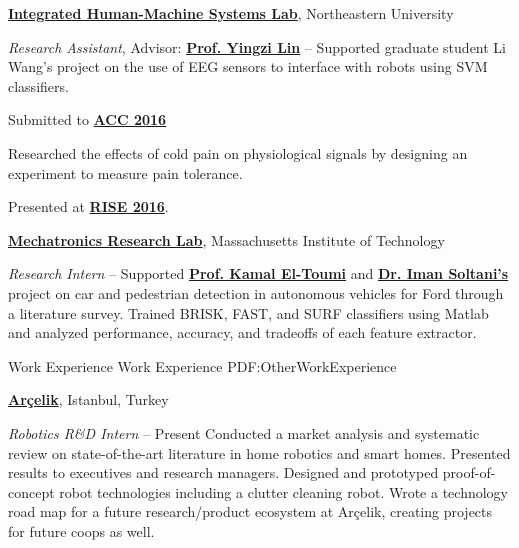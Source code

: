 \documentclass[letterpaper,MMMyyyy,nonstopmode]{simpleresumecv}
\begin{document}
\begin{Body}

\Entry
\href{http://www1.coe.neu.edu/~yilin/ihmslab.html}
{\textbf{Integrated Human-Machine Systems Lab}},
Northeastern University

\Gap
\textit{Research Assistant}, Advisor:
\href{http://www1.coe.neu.edu/~yilin/director.html}{\textbf{Prof. Yingzi Lin}}
\hfill
{} --
\BulletItem
Supported graduate student Li Wang's project on the use of EEG sensors to interface with robots using SVM classifiers. 
\begin{Detail}
	\Item
	Submitted to \href{http://acc2016.a2c2.org/}{\textbf{ACC 2016}}
\end{Detail}
\BulletItem
Researched the effects of cold pain on physiological signals by designing an experiment to measure pain tolerance.
\begin{Detail}
	\Item
	Presented at \href{https://www.northeastern.edu/rise/}{\textbf{RISE 2016}}. 
\end{Detail}


\Entry
\href{http://mechatronics.mit.edu/}
{\textbf{Mechatronics Research Lab}},
Massachusetts Institute of Technology

\Gap
\textit{Research Intern}
\hfill
{} --
\BulletItem
Supported \href{http://meche.mit.edu/people/faculty/youcef@mit.edu}{\textbf{Prof. Kamal El-Toumi}} and \href{https://www.linkedin.com/in/iman-soltani-bozchalooi-31a7b281/}{\textbf{Dr. Iman Soltani's}} project on car and pedestrian detection in autonomous vehicles for Ford through a literature survey. Trained BRISK, FAST, and SURF classifiers using Matlab and analyzed performance, accuracy, and tradeoffs of each feature extractor.


\Section
{Work Experience}
{Work Experience}
{PDF:OtherWorkExperience}


\Entry
\href{http://www.arcelikas.com/page/69/Technology_and_Innovation}
{\textbf{Ar\c{c}elik}}, 
Istanbul, Turkey

\Gap
\textit{Robotics R\&D Intern}
\hfill
{} -- Present
\BulletItem
Conducted a market analysis and systematic review on state-of-the-art literature in home robotics and smart homes. Presented results to executives and research managers.
\BulletItem
Designed and prototyped proof-of-concept robot technologies including a clutter cleaning robot.
\BulletItem
Wrote a technology road map for a future research/product ecosystem at Ar\c{c}elik, creating projects for future coops as well.
\SectionSpace


\end{Body}
\end{document}
